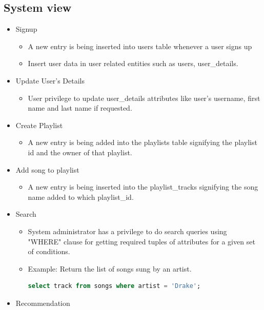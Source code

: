 \documentclass[10pt]{article}
\begin{document}
\subsection{System view}
\begin{itemize}
     \item Signup
    \begin{itemize}
        \item A new entry is being inserted into users table whenever a user signs up
        \item Insert user data in user related entities such as users, user\_details.
    \end{itemize}
    \item Update User's Details
    \begin{itemize}
        \item User privilege to update user\_details attributes like user's username, first name and last name if requested. 
    \end{itemize}
    \item Create Playlist
    \begin{itemize}
        \item A new entry is being added into the playlists table signifying the playlist id and the owner of that playlist.
    \end{itemize}
     \item Add song to playlist
     \begin{itemize}
         \item A new entry is being inserted into the playlist\_tracks signifying the song name added to which playlist\_id.
     \end{itemize}
     \item Search 
     \begin{itemize}
        \item System administrator has a privilege to do search queries using "WHERE" clause for getting required tuples of attributes for a given set of conditions.
         \item Example: Return the list of songs sung by an artist. 
         \begin{lstlisting}[language=SQL,
                deletekeywords={IDENTITY,INT},
                morekeywords={clustered},    
                framesep=10pt,
                framextopmargin=10pt]
    select track from songs where artist = 'Drake';
            \end{lstlisting}
     \end{itemize}
    \item Recommendation

\end{itemize}
\end{document}
